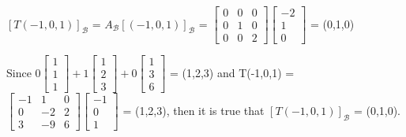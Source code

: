 \begin{tbox}
        $[T(-1,0,1)]_{\mathcal{B}}$
        = $A_{\mathcal{B}} [(-1,0,1)]_{\mathcal{B}}$ =
        $\begin{bmatrix}
            0 & 0 & 0 \\
            0 & 1 & 0 \\
            0 & 0 & 2
        \end{bmatrix}
        \begin{bmatrix}
            -2 \\
            1 \\
            0
        \end{bmatrix}$
        = (0,1,0)

        Since
        \footnotesize
        $0\begin{bmatrix}
            1 \\
            1 \\
            1
        \end{bmatrix} +
        1\begin{bmatrix}
            1 \\
            2 \\
            3
        \end{bmatrix} +
        0\begin{bmatrix}
            1 \\
            3 \\
            6
        \end{bmatrix}$
        \normalsize
        = (1,2,3)
        and T(-1,0,1) =
        \footnotesize
        $\begin{bmatrix}
            -1 & 1 & 0 \\
            0 & -2 & 2 \\
            3 & -9 & 6
        \end{bmatrix}
        \begin{bmatrix}
            -1 \\
            0 \\
            1
        \end{bmatrix}$
        \normalsize
        = (1,2,3), then it is true that
        $[T(-1,0,1)]_{\mathcal{B}}$ = (0,1,0).
    \end{tbox}





